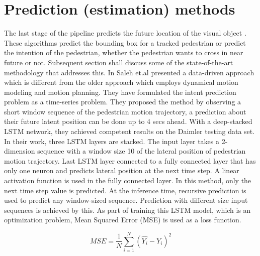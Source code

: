 \section{Prediction (estimation) methods }
The last stage of the pipeline predicts the future location of the visual object \cite{saleh2017intent, zhang2019sr, xue2018ss, lipton2015critical}. These algorithms predict the bounding box for a tracked pedestrian or predict the intention of the pedestrian, whether the pedestrian wants to cross in near future or not. Subsequent section shall discuss some of the state-of-the-art methodology that addresses this.
In \cite{saleh2017intent} Saleh et.al presented a data-driven approach which is different from the older approach which employs dynamical motion modeling and motion planning. They have formulated the intent prediction problem as a time-series problem. They proposed the method by observing a short window sequence of the pedestrian motion trajectory, a prediction about their future latent position can be done up to 4 secs ahead. With a deep-stacked LSTM network, they achieved competent results on the Daimler testing data set. In their work, three LSTM layers are stacked. The input layer takes a 2-dimension sequence with a window size 10 of the lateral position of pedestrian motion trajectory. Last LSTM layer connected to a fully connected layer that has only one neuron and predicts lateral position at the next time step. A linear activation function is used in the fully connected layer. In this method, only the next time step value is predicted. At the inference time, recursive prediction is used to predict any window-sized sequence. Prediction with different size input sequences is achieved by this.
As part of training this LSTM  model, which is an optimization problem, Mean Squared Error (MSE) is used as a loss function.

\begin{equation}
MSE= \frac{1}{N}\sum_{i=1}^{N}(\hat{Y_i} - Y_i)^2
\end{equation}

